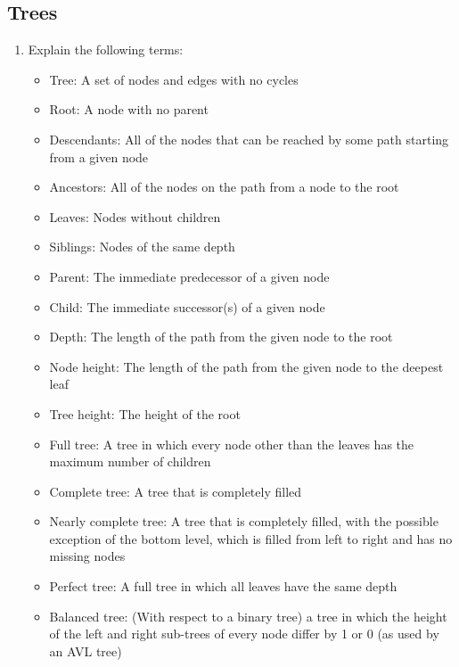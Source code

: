 \documentclass[10pt]{article}
\begin{document}
\subsection{Trees}
\begin{enumerate}[leftmargin=0em]\addtocounter{enumi}{25}
\item Explain the following terms: 
\begin{multicols}{2}
    \begin{itemize}
        \item Tree: A set of nodes and edges with no cycles
        \item Root: A node with no parent
        \item Descendants: All of the nodes that can be reached by some path starting from a given node
        \item Ancestors: All of the nodes on the path from a node to the root
        \item Leaves: Nodes without children
        \item Siblings: Nodes of the same depth
        \item Parent: The immediate predecessor of a given node
        \item Child: The immediate successor(s) of a given node
        \item Depth: The length of the path from the given node to the root 
        \item Node height: The length of the path from the given node to the deepest leaf
        \item Tree height: The height of the root
        \item Full tree: A tree in which every node other than the leaves has the maximum number of children
        \item Complete tree: A tree that is completely filled
        \item Nearly complete tree: A tree that is completely filled, with the possible exception of the bottom level, which is filled from left to right and has no missing nodes
        \item Perfect tree: A full tree in which all leaves have the same depth
        \item Balanced tree: (With respect to a binary tree) a tree in which the height of the left and right sub-trees of every node differ by 1 or 0 (as used by an AVL tree)
    \end{itemize}    
\end{multicols}


\end{enumerate}
\end{document}
